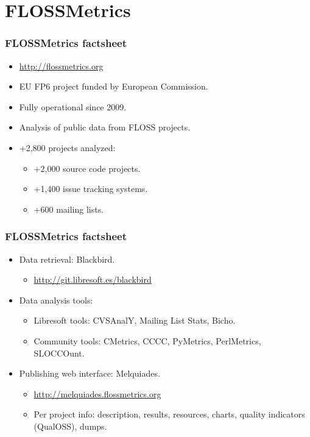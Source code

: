 \documentclass{beamer}
\begin{document}
\section{FLOSSMetrics}

\begin{frame}
\frametitle{FLOSSMetrics factsheet}
\begin{itemize}
\item \url{http://flossmetrics.org}
\item EU FP6 project funded by European Commission.
\item Fully operational since 2009.
\item Analysis of public data from FLOSS projects.
\item +2,800 projects analyzed:
\begin{itemize}
 \item +2,000 source code projects.
 \item +1,400 issue tracking systems.
 \item +600 mailing lists.
\end{itemize}
\end{itemize}
\end{frame}

\begin{frame}
\frametitle{FLOSSMetrics factsheet}
\begin{itemize}
\item Data retrieval: Blackbird.
\begin{itemize}
 \item \url{http://git.libresoft.es/blackbird}
\end{itemize}
\item Data analysis tools:
\begin{itemize}
 \item Libresoft tools: CVSAnalY, Mailing List Stats, Bicho.
 \item Community tools: CMetrics, CCCC, PyMetrics, PerlMetrics, SLOCCOunt.
\end{itemize}
\item Publishing web interface: Melquiades.
\begin{itemize}
 \item \url{http://melquiades.flossmetrics.org}
 \item Per project info: description, results, resources, charts, quality indicators (QualOSS), dumps.
\end{itemize}

\end{itemize}
\end{frame}
\end{document}
